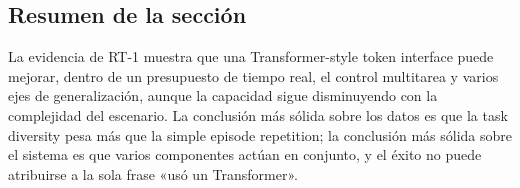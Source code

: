 \subsection{Resumen de la sección}

La evidencia de RT-1 muestra que una Transformer-style token interface puede mejorar, dentro de un presupuesto de tiempo real, el control multitarea y varios ejes de generalización, aunque la capacidad sigue disminuyendo con la complejidad del escenario. La conclusión más sólida sobre los datos es que la task diversity pesa más que la simple episode repetition; la conclusión más sólida sobre el sistema es que varios componentes actúan en conjunto, y el éxito no puede atribuirse a la sola frase «usó un Transformer».
